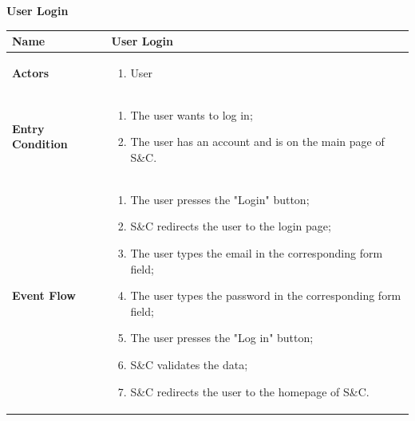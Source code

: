         \begin{enumerate}[label=\textbf{[US\arabic*]}, left = 0pt, align = left]
            \item \textbf{User Login}
            
            \begin{longtable}{|l|p{11cm}|}  
                \hline
                \textbf{Name} & 
                    \textbf{User Login} \\
                \hline
                
                \textbf{Actors} & 
                    \begin{enumerate}[label=\textbullet, itemsep=0em]
                        \item User
                    \end{enumerate} \\
                \hline
                
                \textbf{Entry Condition} & 
                    \begin{enumerate}[label=\textbullet, itemsep=0em]
                        \item The user wants to log in;
                        \item The user has an account and is on the main page of S\&C.
                    \end{enumerate} \\
                \hline
                
                \textbf{Event Flow} &
                    \begin{enumerate}[label=\arabic*., itemsep=0.2em]
                        \item The user presses the "Login" button;
                        \item S\&C redirects the user to the login page;
                        \item The user types the email in the corresponding form field;
                        \item The user types the password in the corresponding form field;
                        \item The user presses the "Log in" button;
                        \item S\&C validates the data;
                        \item S\&C redirects the user to the homepage of S\&C.
                    \end{enumerate} \\
                \hline
                

\end{longtable}
\end{enumerate}
